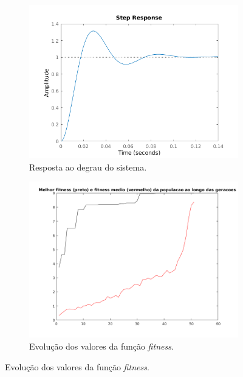 \begin {enumerate}
	\FloatBarrier
			    
	\begin{figure}[h!]
	
	\centering
	
		\begin{subfigure}{.5\textwidth}
		  \centering
		  \includegraphics[width=1\linewidth]{pid/step_pid_ex_d_mod}
		  \caption{Resposta ao degrau do sistema.}
		  \label{fig:pid_step_d_mod}
		\end{subfigure}%
		\begin{subfigure}{.5\textwidth}
		  \centering
		  \includegraphics[width=1\linewidth]{pid/melhor_fitness_pid_ex_d_mod}
		  \caption{Evolução dos valores da função \textit{fitness}.}
		  \label{fig:pid_fitness_d_mod}
		\end{subfigure}%
		

\end{figure}
\end{enumerate}
